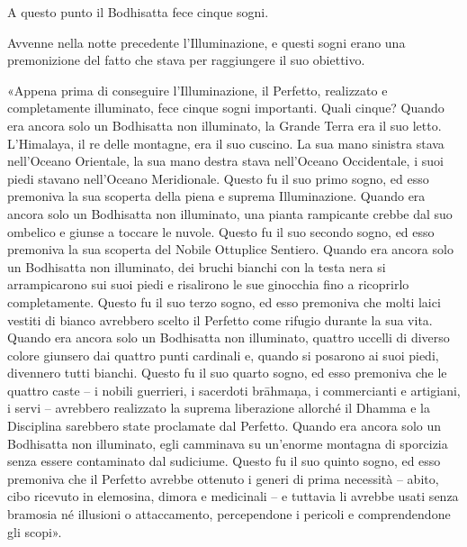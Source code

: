 

 A questo punto il Bodhisatta fece cinque sogni.


 Avvenne nella notte precedente l’Illuminazione, e
questi sogni erano una premonizione del fatto che stava per raggiungere
il suo obiettivo.


 «Appena prima di conseguire l’Illuminazione, il Perfetto,
realizzato e completamente illuminato, fece cinque sogni importanti.
Quali cinque? Quando era ancora solo un Bodhisatta non illuminato, la
Grande Terra era il suo letto. L’Himalaya, il re delle montagne, era il
suo cuscino. La sua mano sinistra stava nell’Oceano Orientale, la sua
mano destra stava nell’Oceano Occidentale, i suoi piedi stavano
nell’Oceano Meridionale. Questo fu il suo primo sogno, ed esso premoniva
la sua scoperta della piena e suprema Illuminazione. Quando era ancora
solo un Bodhisatta non illuminato, una pianta rampicante crebbe dal suo
ombelico e giunse a toccare le nuvole. Questo fu il suo secondo sogno,
ed esso premoniva la sua scoperta del Nobile Ottuplice Sentiero. Quando
era ancora solo un Bodhisatta non illuminato, dei bruchi bianchi con la
testa nera si arrampicarono sui suoi piedi e risalirono le sue ginocchia
fino a ricoprirlo completamente. Questo fu il suo terzo sogno, ed esso
premoniva che molti laici vestiti di bianco avrebbero scelto il Perfetto
come rifugio durante la sua vita. Quando era ancora solo un Bodhisatta
non illuminato, quattro uccelli di diverso colore giunsero dai quattro
punti cardinali e, quando si posarono ai suoi piedi, divennero tutti
bianchi. Questo fu il suo quarto sogno, ed esso premoniva che le quattro
caste – i nobili guerrieri, i sacerdoti brāhmaṇa, i commercianti e
artigiani, i servi – avrebbero realizzato la suprema liberazione
allorché il Dhamma e la Disciplina sarebbero state proclamate dal
Perfetto. Quando era ancora solo un Bodhisatta non illuminato, egli
camminava su un’enorme montagna di sporcizia senza essere contaminato
dal sudiciume. Questo fu il suo quinto sogno, ed esso premoniva che il
Perfetto avrebbe ottenuto i generi di prima necessità – abito, cibo
ricevuto in elemosina, dimora e medicinali – e tuttavia li avrebbe usati
senza bramosia né illusioni o attaccamento, percependone i pericoli e
comprendendone gli scopi».





